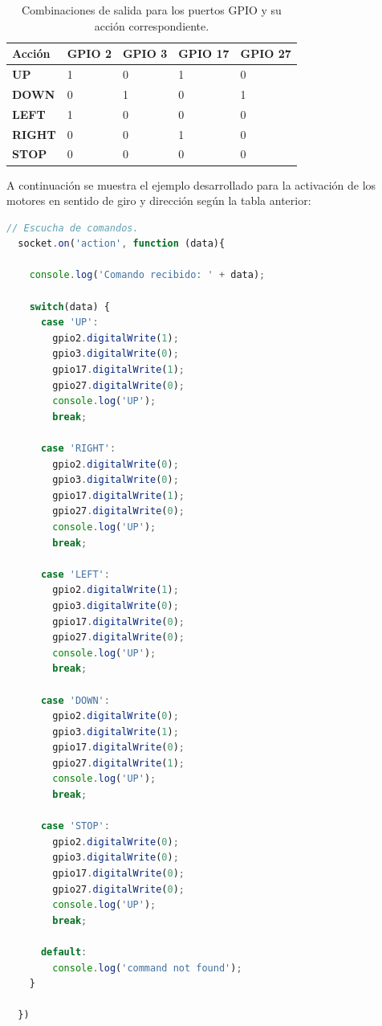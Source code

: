 \begin{table}[H]
  \begin{center}
    \begin{tabular}{|p{2.5cm}|p{2.5cm}|p{2.5cm}|p{2.5cm}|p{2.5cm}|}
      \hline
      {\textbf{Acción}} & \textbf{ GPIO 2 } & \textbf{ GPIO 3 } & \textbf{  GPIO 17 } & \textbf{ GPIO 27 }\\
      \hline
      { \textbf{ UP } } & { 1 } & { 0 }  & { 1 }  & { 0 }  \\
      \hline
      { \textbf{ DOWN } } & { 0 } & { 1 }  & { 0 }  & { 1 } \\
      \hline
      { \textbf{ LEFT } } & { 1 } & { 0 }  & { 0 }  & { 0 } \\
      \hline
      { \textbf{ RIGHT } } & { 0 } & { 0 }  & { 1 }  & { 0 } \\
      \hline
      { \textbf{ STOP } } & { 0 } & { 0 }  & { 0 }  & { 0 }  \\
     \hline   
    \end{tabular}
  \end{center}
\caption{ Combinaciones de salida para los puertos GPIO y su acción correspondiente. }
\label{table:table-pin-out}
\end{table}

A continuación se muestra el ejemplo desarrollado para la activación de los motores en sentido de giro y dirección según la tabla anterior:\\

\begin{lstlisting}[language=JavaScript]
  // Escucha de comandos.  
  socket.on('action', function (data){

    console.log('Comando recibido: ' + data);

    switch(data) {
      case 'UP':
        gpio2.digitalWrite(1);
        gpio3.digitalWrite(0);
        gpio17.digitalWrite(1);
        gpio27.digitalWrite(0);
        console.log('UP');
        break;

      case 'RIGHT':
        gpio2.digitalWrite(0);
        gpio3.digitalWrite(0);
        gpio17.digitalWrite(1);
        gpio27.digitalWrite(0);
        console.log('UP');
        break;

      case 'LEFT':
        gpio2.digitalWrite(1);
        gpio3.digitalWrite(0);
        gpio17.digitalWrite(0);
        gpio27.digitalWrite(0);
        console.log('UP');
        break;

      case 'DOWN':
        gpio2.digitalWrite(0);
        gpio3.digitalWrite(1);
        gpio17.digitalWrite(0);
        gpio27.digitalWrite(1);
        console.log('UP');
        break;

      case 'STOP':
        gpio2.digitalWrite(0);
        gpio3.digitalWrite(0);
        gpio17.digitalWrite(0);
        gpio27.digitalWrite(0);
        console.log('UP');
        break;

      default:
        console.log('command not found');
    }

  })
    
\end{lstlisting}


